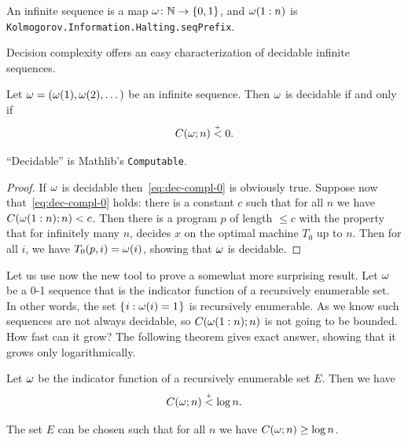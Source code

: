 \begin{formalization}
An infinite sequence is a map \( \omega \colon \mathbb{N} \to \{0, 1\} \), and \( \omega(1:n) \) is
\texttt{Kolmogorov.Information.Halting.seqPrefix}.
\end{formalization}

Decision complexity offers an easy characterization of decidable infinite
sequences.

 \begin{theorem}
  \label{thm:g3.2.1}
  \leanok
Let \( \omega = (\omega(1), \omega(2),\dotsc) \) be an infinite sequence.
Then \( \omega \) is decidable if and only if
\begin{equation}\label{eq:dec-compl-0}
   C(\omega ; n) \stackrel{{}_+}{<} 0.
\end{equation}
 \end{theorem}

\begin{formalization}
``Decidable'' is Mathlib's \texttt{Computable}.
\end{formalization}

 \begin{proof}
  \leanok
If \( \omega \) is decidable then~\eqref{eq:dec-compl-0} is obviously true.
Suppose now that~\eqref{eq:dec-compl-0} holds:
there is a constant \( c \) such that for all \( n \) we have \( C(\omega(1:n);n) < c \).
Then there is a program \( p \) of length \( \le c \) with the property that for
infinitely many \( n \), decides \( x \) on the optimal machine \( T_{0} \) up to \( n \).
Then for all \( i \), we have \( T_{0}(p,i) = \omega(i) \), showing that \( \omega \) is
decidable.
 \end{proof}

Let us use now the new tool to prove a somewhat more surprising result.
Let \( \omega \) be a 0-1 sequence that is the indicator function of a recursively
enumerable set.
In other words, the set \( \mathopen\{\mskip 1mu i: \omega(i) = 1\mskip 1mu\mathclose\} \) is recursively enumerable.
As we know such sequences are not always decidable, so \( C(\omega(1:n) ; n) \) is
not going to be bounded.
How fast can it grow?
The following theorem gives exact answer, showing that it grows
only logarithmically.

 \begin{theorem}
  \label{thm:g3.2.2}
  \leanok
 \begin{alphenum}
  \item\label{i:Barzdin-upper}
Let \( \omega \) be the indicator function of a recursively enumerable set \( E \).
Then we have
 \[
   C(\omega ; n) \stackrel{{}_+}{<} \log n.
 \]
  \item\label{i:Barzdin-lower}
The set \( E \) can be chosen such that for all \( n \) we have 
\( C(\omega ; n) \ge \log n \).
 \end{alphenum}
 \end{theorem}

